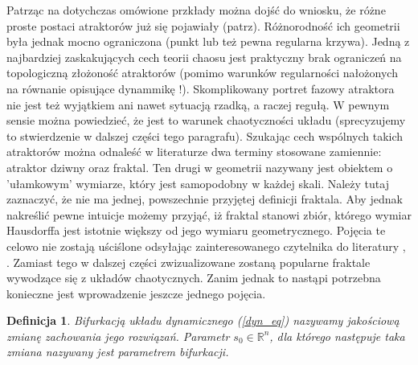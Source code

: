 \documentclass[12pt]{article}
\newtheorem{defi}{Definicja}
\begin{document}
Patrząc na dotychczas omówione przkłady można dojść do wniosku, że różne proste postaci atraktorów już się pojawiały (patrz). Różnorodność ich geometrii była jednak mocno ograniczona (punkt lub też pewna regularna krzywa). Jedną z najbardziej zaskakujących cech teorii chaosu jest praktyczny brak ograniczeń na topologiczną złożoność atraktorów (pomimo warunków regularności nałożonych na równanie opisujące dynammikę !). Skomplikowany portret fazowy atraktora nie jest też wyjątkiem ani nawet sytuacją rzadką, a raczej regułą. W pewnym sensie można powiedzieć, że jest to warunek chaotyczności układu (sprecyzujemy to stwierdzenie w dalszej części tego paragrafu). Szukając cech wspólnych takich atraktorów można odnaleść w literaturze dwa terminy stosowane zamiennie: atraktor dziwny oraz fraktal. Ten drugi w geometrii nazywany jest obiektem o 'ułamkowym' wymiarze, który jest samopodobny w każdej skali. Należy tutaj zaznaczyć, że nie ma jednej, powszechnie przyjętej definicji fraktala. Aby jednak nakreślić pewne intuicje możemy przyjąć, iż fraktal stanowi zbiór, którego wymiar Hausdorffa jest istotnie większy od jego wymiaru geometrycznego. Pojęcia te celowo nie zostają uściślone odsyłając zainteresowanego czytelnika do literatury \cite{Tempczyk}, \cite{Kudrewicz}. Zamiast tego w dalszej części zwizualizowane zostaną popularne fraktale wywodzące się z układów chaotycznych. Zanim jednak to nastąpi potrzebna konieczne jest wprowadzenie jeszcze jednego pojęcia.
\begin{defi}
	Bifurkacją układu dynamicznego (\ref{dyn_eq}) nazywamy jakościową zmianę zachowania jego rozwiązań. Parametr $ s_{0} \in \mathbb{R}^{n} $, dla którego następuje taka zmiana nazywany jest parametrem bifurkacji. 
\end{defi}
\end{document}
